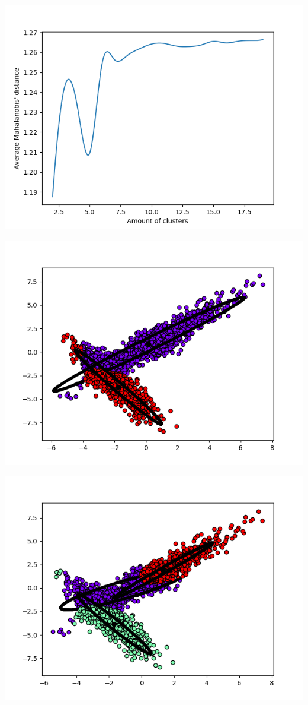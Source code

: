\includegraphics[width=\textwidth]{./plots/avrg_distance_for_k.png}

\includegraphics[width=\textwidth]{./plots/plot_for_k_2.png}

\includegraphics[width=\textwidth]{./plots/plot_for_k_3.png}

